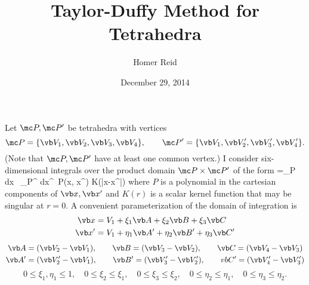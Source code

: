 \documentclass[letterpaper]{article}
\title{Taylor-Duffy Method for Tetrahedra}
\author {Homer Reid}
\date {December 29, 2014}
\begin{document}
\pagestyle{myheadings}
\maketitle

\tableofcontents

Let $\mc P, \mc P^\prime$ be tetrahedra with vertices
$$ \mc P=\{\vb V_1, \vb V_2, \vb V_3, \vb V_4\}, \qquad 
   \mc P^\prime=\{\vb V_1, \vb V_2^\prime, \vb V_3^\prime, \vb V_4^\prime\}.
$$
(Note that $\mc P, \mc P^\prime$ have at least one common vertex.)
I consider six-dimensional integrals over the product 
domain $\mc P\times \mc P^\prime$ of the form
{
=\int_{\mc P} d\vb x \, \int_{\mc P^\prime} d\vb x^\prime \, 
  P(\vb x, \vb x^\prime) K(|\vb x-\vb x^\prime|)
}
where $P$ is a polynomial in the cartesian components of 
$\vb x, \vb x^\prime$ and $K(r)$ is a scalar kernel function that
may be singular at $r=0$. A convenient parameterization of the 
domain of integration is 
\begin{align*}
 \vb x &= V_1 + \xi_1 \vb A
              + \xi_2 \vb B
              + \xi_3 \vb C
\\
 \vb x^\prime &= V_1 + \eta_1 \vb A^\prime
                     + \eta_2 \vb B^\prime
                     + \eta_3 \vb C^\prime
\end{align*}
\begin{align*}
 \vb A&=(\vb V_2-\vb V_1), \qquad 
 \vb B=(\vb V_3-\vb V_2),  \qquad
 \vb C=(\vb V_4-\vb V_3)
\\
 \vb A^\prime&=(\vb V_2^\prime-\vb V_1),       \qquad 
 \vb B^\prime=(\vb V_3^\prime-\vb V_2^\prime), \qquad
 vb C^\prime=(\vb V_4^\prime-\vb V_3^\prime)
\end{align*}
$$
       0 \le \xi_1, \eta_1 \le 1,
\quad 0 \le \xi_2 \le \xi_1, 
\quad 0 \le \xi_3 \le \xi_2, 
\quad 0 \le \eta_2 \le \eta_1, 
\quad 0 \le \eta_3 \le \eta_2.
$$
\end{document}
